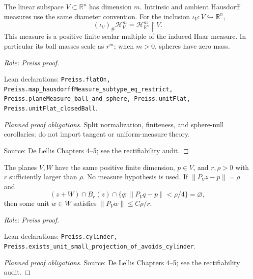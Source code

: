 \begin{lemma}
\label{lem:plane-hausdorff}








The linear subspace \(V\subset\mathbb R^n\) has dimension \(m\). Intrinsic and ambient Hausdorff measures use the same diameter convention.
For the inclusion \(\iota_V:V\hookrightarrow\mathbb R^n\),
\[
 (\iota_V)_\#\mathcal H_V^m=\mathcal H_{\mathbb R^n}^m\!\restriction V.
\]
This measure is a positive finite scalar multiple of the induced Haar measure. In particular its ball masses scale as \(r^m\); when \(m>0\), spheres have zero mass.
\par\emph{Role: Preiss proof.}
\par Lean declarations: \texttt{Preiss.flatOn, Preiss.map\_hausdorffMeasure\_subtype\_eq\_restrict, Preiss.planeMeasure\_ball\_and\_sphere, Preiss.unitFlat, Preiss.unitFlat\_closedBall}.
\end{lemma}
\begin{proof}[Planned proof obligations]
Split normalization, finiteness, and sphere-null corollaries; do not import tangent or uniform-measure theory.
\par Source: De Lellis Chapters 4--5; see the rectifiability audit.
\end{proof}

\begin{lemma}
\label{lem:empty-cylinder-direction}








The planes \(V,W\) have the same positive finite dimension, \(p\in V\), and \(r,\rho>0\) with \(r\) sufficiently larger than \(\rho\). No measure hypothesis is used.
If \(\|P_Vz-p\|=\rho\) and
\[
 (z+W)\cap B_r(z)\cap\{q:\|P_Vq-p\|<\rho/4\}=\varnothing,
\]
then some unit \(w\in W\) satisfies \(\|P_Vw\|\leq C\rho/r\).
\par\emph{Role: Preiss proof.}
\par Lean declarations: \texttt{Preiss.cylinder, Preiss.exists\_unit\_small\_projection\_of\_avoids\_cylinder}.
\end{lemma}
\begin{proof}[Planned proof obligations]
\par Source: De Lellis Chapters 4--5; see the rectifiability audit.
\end{proof}

